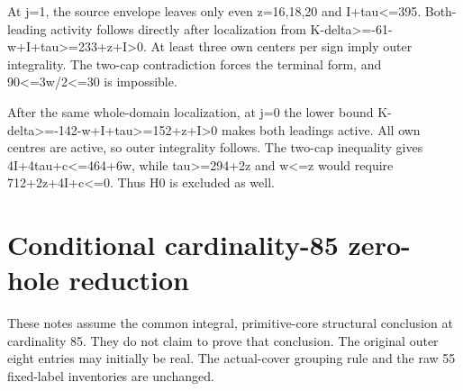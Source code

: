 \documentclass[10pt,a4paper]{article}
\theoremstyle{definition}
\begin{document}
At j=\allowbreak{}1,\allowbreak{} the source envelope leaves only even z=\allowbreak{}16,\allowbreak{}18,\allowbreak{}20 and
I+\allowbreak{}tau\textless=\allowbreak{}395. Both-leading activity follows directly after
localization from
K-delta\textgreater=\allowbreak{}-61-w+\allowbreak{}I+\allowbreak{}tau\textgreater=\allowbreak{}233+\allowbreak{}z+\allowbreak{}I\textgreater0. At
least three own centers per sign imply outer integrality. The two-cap
contradiction forces the terminal form,\allowbreak{} and 90\textless=\allowbreak{}3w/2\textless=\allowbreak{}30
is impossible.

After the same whole-domain localization,\allowbreak{} at j=\allowbreak{}0 the lower bound
K-delta\textgreater=\allowbreak{}-142-w+\allowbreak{}I+\allowbreak{}tau\textgreater=\allowbreak{}152+\allowbreak{}z+\allowbreak{}I\textgreater0 makes
both leadings active. All own centres are active,\allowbreak{} so outer integrality
follows. The two-cap inequality gives 4I+\allowbreak{}4tau+\allowbreak{}c\textless=\allowbreak{}464+\allowbreak{}6w,\allowbreak{} while
tau\textgreater=\allowbreak{}294+\allowbreak{}2z and w\textless=\allowbreak{}z would require
712+\allowbreak{}2z+\allowbreak{}4I+\allowbreak{}c\textless=\allowbreak{}0. Thus H0 is excluded as well.

\clearpage
\hypertarget{conditional-cardinality-85-zero-hole-reduction}{%
\section{Conditional cardinality-85 zero-hole
reduction}\label{conditional-cardinality-85-zero-hole-reduction}}

These notes assume the common integral,\allowbreak{} primitive-core structural
conclusion at cardinality 85. They do not claim to prove that
conclusion. The original outer eight entries may initially be real. The
actual-cover grouping rule and the raw 55 fixed-label inventories are
unchanged.
\end{document}
